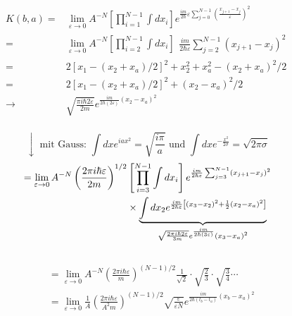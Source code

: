 $$
\begin{aligned} 
K(b, a)= & \lim _{\varepsilon \rightarrow 0} A^{-N}\left[\prod_{i=1}^{N-1} \int d x_{i}\right] e^{\frac{i m}{2 \hbar} \varepsilon \sum_{j=0}^{N-1}\left(\frac{x_{j+1}-x_{j}}{\varepsilon}\right)^{2}} 
\\
= & \lim _{\varepsilon \rightarrow 0} A^{-N}\left[\prod_{i=2}^{N-1} \int d x_{i}\right] 
\begin{array}
    {l}{\frac{i m}{2 \hbar \varepsilon} \sum_{j=2}^{N-1}\left(x_{j+1}-x_{j}\right)^{2}}
\end{array} 
\\ 
= & 2\left[x_{1}-\left(x_{2}+x_{a}\right) / 2\right]^{2}+x_{2}^{2}+x_{a}^{2}-\left(x_{2}+x_{a}\right)^{2} / 2 
\\
= & 2\left[x_{1}-\left(x_{2}+x_{a}\right) / 2\right]^{2}+\left(x_{2}-x_{a}\right)^{2} / 2 
\\ \rightarrow & \sqrt{\frac{\pi i \hbar 2 \varepsilon}{2 m}} e^{\frac{i m}{2 h(2 \varepsilon)}\left(x_{2}-x_{a}\right)^{2}} %
\end{aligned}
$$\\
$$
\downarrow \text { mit Gauss: } \int d x e^{i a x^{2}}=\sqrt{\frac{i \pi}{a}} \text { und } \int d x e^{-\frac{x^{2}}{2 \sigma}}=\sqrt{2 \pi \sigma}
$$
$$\\
\begin{aligned}=\lim _{\varepsilon \rightarrow 0} A^{-N}\left(\frac{2 \pi i \hbar \varepsilon}{2 m}\right)^{1 / 2} &\left[\prod_{i=3}^{N-1} \int d x_{i}\right] e^{\frac{i m}{2 \hbar \varepsilon} \sum_{j=3}^{N-1}\left(x_{j+1}-x_{j}\right)^{2}} \\ & \times \underbrace{\int d x_{2} e^{\frac{i m}{2 \hbar \varepsilon}\left[\left(x_{3}-x_{2}\right)^{2}+\frac{1}{2}\left(x_{2}-x_{a}\right)^{2}\right]}}_{\sqrt{\frac{2 \pi i \hbar 2 \varepsilon}{3 m}} e^{\frac{i m}{2 \hbar(3 \varepsilon)}}\left(x_{3}-x_{a}\right)^{2}} \end{aligned}
$$\\
$$
\begin{aligned} &=\lim _{\varepsilon \rightarrow 0} A^{-N}\left(\frac{2 \pi i \hbar \varepsilon}{m}\right)^{(N-1) / 2} \frac{1}{\sqrt{2}} \cdot \sqrt{\frac{2}{3}} \cdot \sqrt{\frac{3}{4}} \cdots \\ &=\lim _{\varepsilon \rightarrow 0} \frac{1}{A}\left(\frac{2 \pi i \hbar \varepsilon}{A^{2} m}\right)^{(N-1) / 2} \sqrt{\frac{\varepsilon}{\varepsilon N}} e^{\frac{i m}{2 \hbar\left(t_{b}-t_{a}\right)}\left(x_{b}-x_{a}\right)^{2}} \end{aligned}
$$\\
